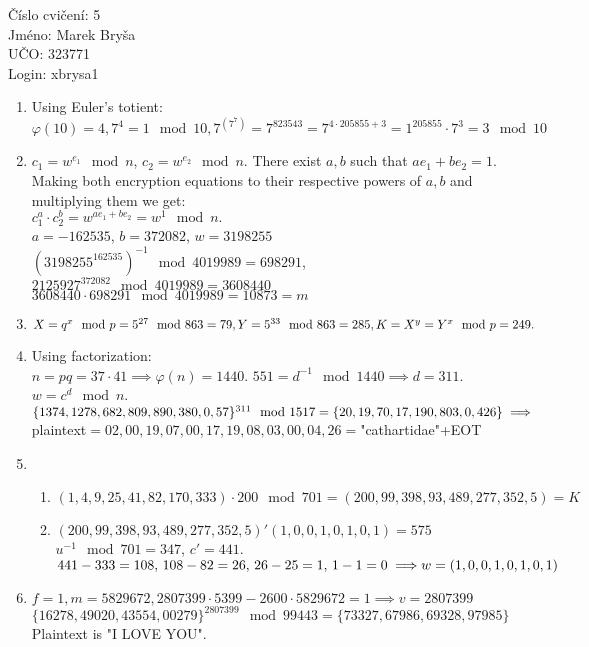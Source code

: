 \documentclass[a4paper,12pt]{extarticle}
\begin{document}
\begin{flushleft}
Číslo cvičení: 5 \\ 
Jméno: Marek Bryša \\
UČO: 323771\\
Login: xbrysa1\\
\end{flushleft}
\begin{enumerate}
  \item
    Using Euler's totient:\\
    $\varphi(10)=4, 7^4=1 \mod 10, 7^{(7^7)}=7^{823543}=7^{4\cdot 205855 + 3}=1^{205855}\cdot 7^3=3 \mod 10$
  \item
    $c_1=w^{e_1} \mod n$, $c_2=w^{e_2} \mod n$. There exist $a,b$ such that $ae_1+be_2=1$.
    Making both encryption equations to their respective powers of $a,b$ and multiplying them we get:\\
    $c_1^a\cdot c_2^b=w^{ae_1+be_2}=w^1 \mod n.$\\
    $a=-162535$, $b=372082$, $w=3198255$\\
    $(3198255^{162535})^{-1} \mod 4019989=698291$, $ 2125927^{372082} \mod 4019989=3608440 $\\
    $3608440\cdot 698291 \mod 4019989=10873=m$

  \item
    $X=q^x \mod p=5^{27} \mod 863=79, Y=5^{33} \mod 863=285, \\K=X^y=Y^x \mod p=249.$
  \item
    Using factorization:\\
    $n=pq=37\cdot 41\implies \varphi(n)=1440$. $551=d^{-1} \mod 1440 \implies d= 311$.\\
    $w=c^d \mod n$.
    $\{1374, 1278, 682, 809, 890, 380, 0, 57\}^{311} \mod 1517=\\\{20, 19, 70, 17, 190, 803, 0, 426\} \implies$ \\plaintext$=02,00,19,07,00,17,19,08,03,00,04,26=$"cathartidae"+EOT
  \item
    \begin{enumerate}
      \item
        $(1, 4, 9, 25, 41, 82, 170, 333)\cdot 200 \mod 701=(200, 99, 398, 93, 489, 277, 352, 5)=K$
      \item
        $(200, 99, 398, 93, 489, 277, 352, 5)'(1, 0, 0, 1, 0, 1, 0, 1)= 575$\\
        $u^{-1} \mod 701=347$, $c'=441$.\\
        $441-333=108,\, 108-82=26,\, 26-25=1,\, 1-1=0 \implies \\w= (1, 0, 0, 1, 0, 1, 0, 1)$
    \end{enumerate}
  \item
    $f=1, m=5829672, 2807399\cdot5399-2600\cdot5829672=1\implies v=2807399$\\
    $\{16278,49020,43554,00279\}^{2807399} \mod 99443=\{73327,67986,69328,97985\}$\\
    Plaintext is "I LOVE YOU".
\end{enumerate}
\end{document}
